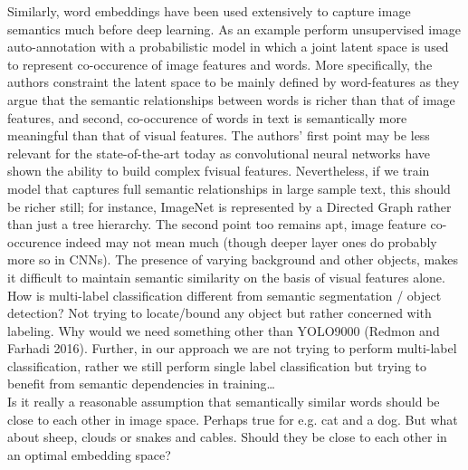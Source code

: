 \documentclass{report}
\begin{document}
Similarly, word embeddings have been used extensively to capture image semantics much before deep learning. As an example \cite{MonayPLSA} perform unsupervised image auto-annotation with a probabilistic model in which a joint latent space is used to represent co-occurence of image features and words. More specifically, the authors constraint the latent space to be mainly defined by word-features as they argue that the semantic relationships between words is richer than that of image features, and second, co-occurence of words in text is semantically more meaningful than that of visual features. The authors' first point may be less relevant for the state-of-the-art today as convolutional neural networks have shown the ability to build complex fvisual features. Nevertheless, if we train model that captures full semantic relationships in large sample text, this should be richer still; for instance, ImageNet is represented by a Directed Graph rather than just a tree hierarchy. The second point too remains apt, image feature co-occurence indeed may not mean much (though deeper layer ones do probably more so in CNNs). The presence of varying background and other objects, makes it difficult to maintain semantic similarity on the basis of visual features alone.  \\

How is multi-label classification different from semantic segmentation / object detection? Not trying to locate/bound any object but rather concerned with labeling. Why would we need something other than YOLO9000 (Redmon and Farhadi 2016). Further, in our approach we are not trying to perform multi-label classification, rather we still perform single label classification but trying to benefit from semantic dependencies in training\dots \\


Is it really a reasonable assumption that semantically similar words should be close to each other in image space. Perhaps true for e.g. cat and a dog. But what about sheep, clouds or snakes and cables. Should they be close to each other in an optimal embedding space? 




\end{document}
